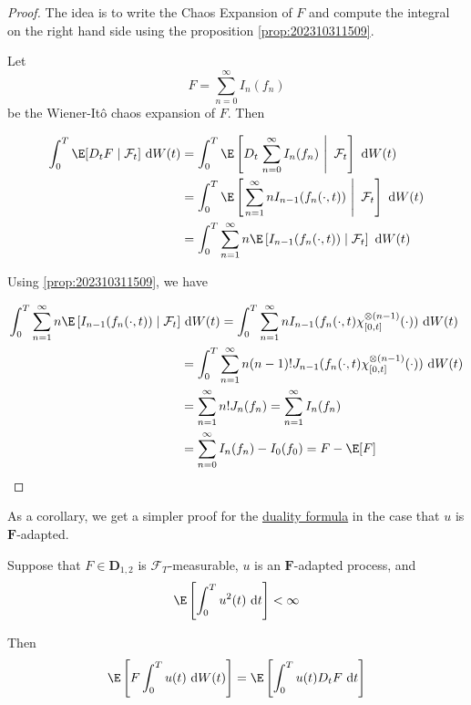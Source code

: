 \begin{proof}
	The idea is to write the Chaos Expansion of $F$ and compute the integral on the right hand side using the proposition \ref{prop:202310311509}.

	Let 
	\[
		F = \sum_{n=0}^\infty I_n(f_n)
	\]
	be the Wiener-Itô chaos expansion of $F$. Then 

	\begin{equation}
		\begin{aligned}
			\int_0^T \E[D_t F \mid \mathcal{F}_t] ~\mathrm{d}W(t) &= \int_0^T \E \left[ D_t \left. \sum_{n=0}^\infty I_n(f_n) ~\right|~ \mathcal{F}_t \right] ~\mathrm{d}W(t) \\
										      &= \int_0^T \E \left[ \left. \sum_{n=1}^\infty n I_{n-1}(f_n(\cdot, t)) ~\right|~ \mathcal{F}_t \right] ~\mathrm{d}W(t) \\
										      &= \int_0^T \sum_{n=1}^\infty n \E \left[ I_{n-1}(f_n(\cdot, t)) \mid \mathcal{F}_t \right] ~\mathrm{d}W(t)
		\end{aligned}
	\end{equation}
	
	Using \ref{prop:202310311509}, we have

	\begin{equation}
		\begin{aligned}
			\int_0^T \sum_{n=1}^\infty n \E \left[ I_{n-1}(f_n(\cdot, t)) \mid \mathcal{F}_t \right] &~\mathrm{d}W(t) = \int_0^T \sum_{n=1}^\infty n I_{n-1}(f_n(\cdot, t) \chi_{[0,t]}^{\otimes (n-1)}(\cdot)) ~\mathrm{d}W(t) \\
			&= \int_0^T \sum_{n=1}^\infty n (n-1)! J_{n-1}(f_n(\cdot, t) \chi_{[0,t]}^{\otimes (n-1)}(\cdot)) ~\mathrm{d}W(t) \\
			&= \sum_{n=1}^\infty n! J_{n}(f_n) = \sum_{n=1}^\infty I_{n}(f_n) \\
			&= \sum_{n=0}^\infty I_{n}(f_n) - I_0(f_0) = F - \E[F]
		\end{aligned}
	\end{equation}
\end{proof}

As a corollary, we get a simpler proof for the \hyperref[thm:duality_formula]{duality formula} in the case that $u$ is $\mathbf{F}$-adapted. 

\begin{corollary}\label{cor:duality-formula}
	Suppose that $F \in \mathbf{D}_{1,2}$ is $\mathcal{F}_T$-measurable, $u$ is an $\mathbf{F}$-adapted process, and
	\[
		\E\left[ \int_0^T u^2(t) ~\mathrm{d}t \right] < \infty
	\]
	
	Then 
	\begin{equation}
		\E\left[ F \int_0^T u(t) ~\mathrm{d}W(t) \right] = \E\left[ \int_0^T u(t) D_t F ~\mathrm{d}t \right]
	\end{equation}
\end{corollary}

